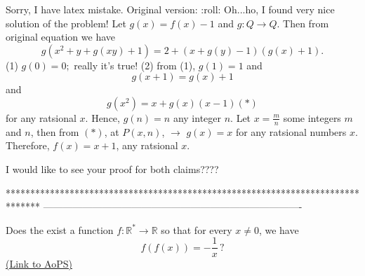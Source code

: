 \begin{solution}
	\begin{tcolorbox}Sorry, I have latex mistake. Original version:  
 :roll: 
Oh...ho, I  found very nice solution of the problem!
Let  $g(x)=f(x)-1$  and  $ g:Q\rightarrow Q $.  Then from original equation  we have \[ g(x^2+y+g(xy)+1)=2+(x+g(y)-1)(g(x)+1) .\]
(1) $g(0)=0; $  really it's true!
(2)  from (1),  $ g(1)=1 $  and 
\[ g(x+1)=g(x)+1 \] and \[ g(x^2)=x+g(x)(x-1) (*)\]
for any ratsional $x$.
Hence, $ g(n)=n $ any integer $n$.    Let $x=\frac{m}{n} $ some integers $m$ and $n$,  then from $(*)$, at $P(x,n)$, $\rightarrow $ $g(x)=x $ for any ratsional numbers $x$.
Therefore, $f(x)=x+1$, any ratsional $x$.\end{tcolorbox}

I would like to see your proof for both claims???? 
\end{solution}
*******************************************************************************
-------------------------------------------------------------------------------

\begin{problem}
	Does the exist a function $ f: \mathbb R^* \rightarrow \mathbb R$ so that for every $ x\ne 0$, we have
\[ f(f(x))=-\frac 1x \, ?\]
	\flushright \href{https://artofproblemsolving.com/community/q2h272801}{(Link to AoPS)}
\end{problem}



